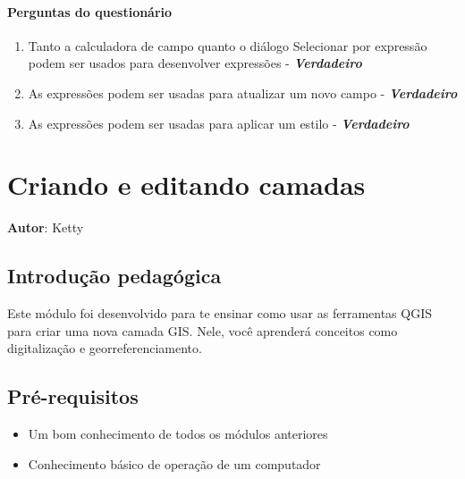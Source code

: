 \documentclass[
]{book}
\providecommand{\tightlist}{%
  \setlength{\itemsep}{0pt}\setlength{\parskip}{0pt}}
\begin{document}
\hypertarget{perguntas-do-questionuxe1rio-16}{%
\subsubsection{\texorpdfstring{\textbf{Perguntas do questionário}}{Perguntas do questionário}}\label{perguntas-do-questionuxe1rio-16}}

\begin{enumerate}
\def\labelenumi{\arabic{enumi}.}
\tightlist
\item
  Tanto a calculadora de campo quanto o diálogo Selecionar por expressão podem ser usados para desenvolver expressões - \textbf{\emph{Verdadeiro}}
\item
  As expressões podem ser usadas para atualizar um novo campo - \textbf{\emph{Verdadeiro}}
\item
  As expressões podem ser usadas para aplicar um estilo - \textbf{\emph{Verdadeiro}}
\end{enumerate}

\hypertarget{criando-e-editando-camadas}{%
\chapter{Criando e editando camadas}\label{criando-e-editando-camadas}}

\textbf{Autor}: Ketty

\hypertarget{introduuxe7uxe3o-pedaguxf3gica-7}{%
\section{Introdução pedagógica}\label{introduuxe7uxe3o-pedaguxf3gica-7}}

Este módulo foi desenvolvido para te ensinar como usar as ferramentas QGIS para criar uma nova camada GIS. Nele, você aprenderá conceitos como digitalização e georreferenciamento.

\hypertarget{pruxe9-requisitos-7}{%
\section{Pré-requisitos}\label{pruxe9-requisitos-7}}

\begin{itemize}
\tightlist
\item
  Um bom conhecimento de todos os módulos anteriores
\item
  Conhecimento básico de operação de um computador
\end{itemize}
\end{document}
